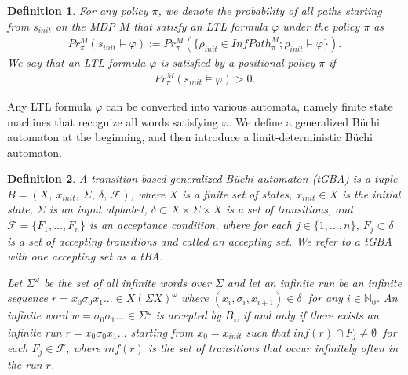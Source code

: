 \documentclass[letterpaper, 10 pt, conference]{ieeeconf}  %
\newtheorem{definition}{Definition}
\begin{document}
\begin{definition}
For any policy $\pi$, we denote the probability of all paths starting from $s_{init}$ on the MDP $M$ that satisfy an LTL formula $\varphi$ under the policy $\pi$ as
\begin{align*}
Pr^{M}_{\pi}(s_{init} \! \models \varphi) := Pr^{M}_{\pi}(\{ \rho_{init} \! \in \! InfPath^{M}_{\pi} ; \rho_{init} \! \models \varphi \}).
\end{align*}
We say that an LTL formula $\varphi$ is satisfied by a positional policy $\pi$ if
\begin{align*}
Pr^{M}_{\pi}(s_{init} \models \varphi) > 0.
\end{align*}



\label{def5}
\end{definition}

Any LTL formula $\varphi$ can be converted into various automata, namely finite state machines that recognize %
all words satisfying $\varphi$.
 We define a generalized B\"{u}chi automaton at the beginning, and then introduce a limit-deterministic B\"{u}chi automaton.

\begin{definition}
  A transition-based generalized B\"{u}chi automaton (tGBA) is a tuple $B = (X,\ x_{init},\ \Sigma,\ \delta,\ \mathcal{F})$, where $X$ is a finite set of states, $x_{init} \in X$ is the initial state, $\Sigma$ is an input alphabet, $\delta \subset  X\times \Sigma \times X$ is a set of transitions, and $\mathcal{F} = \{F_1,\ldots,F_n\}$ is an acceptance condition, where for each $ j \in \{1,\ldots,n\}$, $F_j \subset \delta$ is a set of accepting transitions and called an accepting set. We refer to a tGBA with one accepting set as a tBA.

  Let $\Sigma^{\omega}$ be the set of all infinite words over $\Sigma$ and let an infinite run be an infinite sequence $r = x_0\sigma_0x_1 \ldots \in X (\Sigma X)^{\omega}$ where $(x_i, \sigma_{i}, x_{i+1}) \in \delta\ $ for any $ i\in \mathbb{N}_0$. An infinite word $w = \sigma_0\sigma_1 \ldots \in \Sigma^{\omega}$ is accepted by $B_{\varphi}$ if and only if there exists an infinite run $r = x_0 \sigma_0 x_1 \ldots$ starting from $x_0 = x_{init}$ such that $inf(r) \cap F_j \neq \emptyset\ $ for each $F_j \in \mathcal{F}$, where $inf(r)$ is the set of transitions that occur infinitely often in the run $r$.
\end{definition}
\end{document}

